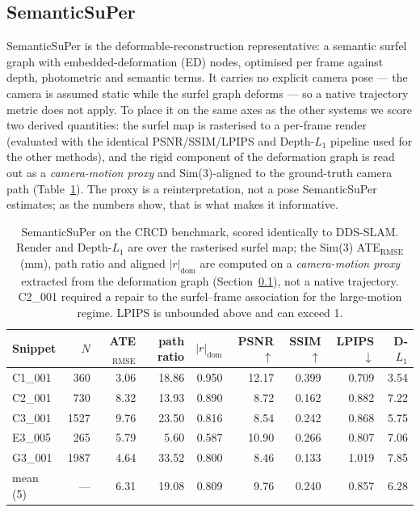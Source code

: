 \subsection{SemanticSuPer}
\label{sec:bench_semsup}

SemanticSuPer \cite{semanticsuper} is the deformable-reconstruction
representative: a semantic surfel graph with embedded-deformation (ED) nodes,
optimised per frame against depth, photometric and semantic terms. It carries
no explicit camera pose --- the camera is assumed static while the surfel graph
deforms --- so a native trajectory metric does not apply. To place it on the
same axes as the other systems we score two derived quantities: the surfel map
is rasterised to a per-frame render (evaluated with the identical PSNR/SSIM/LPIPS
and Depth-$L_1$ pipeline used for the other methods), and the rigid component of
the deformation graph is read out as a \emph{camera-motion proxy} and
Sim(3)-aligned to the ground-truth camera path (Table~\ref{tab:bench_semsup}).
The proxy is a reinterpretation, not a pose SemanticSuPer estimates; as the
numbers show, that is what makes it informative.

\begin{table}[t]
\centering
\caption{SemanticSuPer on the CRCD benchmark, scored identically to DDS-SLAM.
Render and Depth-$L_1$ are over the rasterised surfel map; the Sim(3)
ATE$_{\mathrm{RMSE}}$ (mm), path ratio and aligned $|r|_{\mathrm{dom}}$ are
computed on a \emph{camera-motion proxy} extracted from the deformation graph
(Section~\ref{sec:bench_semsup}), not a native trajectory. C2\_001 required a
repair to the surfel--frame association for the large-motion regime. LPIPS is
unbounded above and can exceed 1.}
\label{tab:bench_semsup}
\small
\begin{tabular}{lrrrrrrrr}
\toprule
Snippet & $N$ & ATE$_{\mathrm{RMSE}}$ & path ratio & $|r|_{\mathrm{dom}}$ &
PSNR$\uparrow$ & SSIM$\uparrow$ & LPIPS$\downarrow$ & D-$L_1$ \\
\midrule
C1\_001 &  360 & 3.06 & 18.86 & 0.950 & 12.17 & 0.399 & 0.709 & 3.54 \\
C2\_001 &  730 & 8.32 & 13.93 & 0.890 &  8.72 & 0.162 & 0.882 & 7.22 \\
C3\_001 & 1527 & 9.76 & 23.50 & 0.816 &  8.54 & 0.242 & 0.868 & 5.75 \\
E3\_005 &  265 & 5.79 &  5.60 & 0.587 & 10.90 & 0.266 & 0.807 & 7.06 \\
G3\_001 & 1987 & 4.64 & 33.52 & 0.800 &  8.46 & 0.133 & 1.019 & 7.85 \\
\midrule
mean (5) & --- & 6.31 & 19.08 & 0.809 &  9.76 & 0.240 & 0.857 & 6.28 \\
\bottomrule
\end{tabular}
\end{table}


